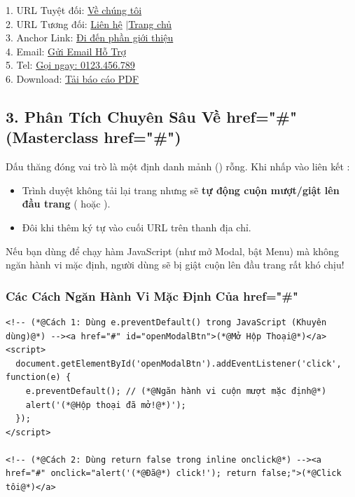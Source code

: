 \begin{browserWindow}
\sffamily\small
1. URL Tuyệt đối: \textcolor{primaryBlue}{\underline{Về chúng tôi}}\\[2pt]
2. URL Tương đối: \textcolor{primaryBlue}{\underline{Liên hệ}} \quad$\vert$\quad \textcolor{primaryBlue}{\underline{Trang chủ}}\\[2pt]
3. Anchor Link: \textcolor{primaryBlue}{\underline{Đi đến phần giới thiệu}}\\[2pt]
4. Email: \textcolor{primaryBlue}{\underline{Gửi Email Hỗ Trợ}}\\[2pt]
5. Tel: \textcolor{primaryBlue}{\underline{Gọi ngay: 0123.456.789}}\\[2pt]
6. Download: \textcolor{primaryBlue}{\underline{Tải báo cáo PDF}}
\end{browserWindow}

\subsection{3. Phân Tích Chuyên Sâu Về href="\#" (Masterclass href="\#")}
Dấu thăng  đóng vai trò là một định danh mảnh () rỗng. Khi nhấp vào liên kết :
\begin{itemize}
    \item Trình duyệt không tải lại trang nhưng sẽ \textbf{tự động cuộn mượt/giật lên đầu trang} ( hoặc ).
    \item Đôi khi thêm ký tự \codeinline{\#} vào cuối URL trên thanh địa chỉ.
\end{itemize}

\begin{warnBox}[Cạm Bẫy Giật Cuộn Trang Khi Dùng href="\#"]
Nếu bạn dùng  để chạy hàm JavaScript (như mở Modal, bật Menu) mà không ngăn hành vi mặc định, người dùng sẽ bị giật cuộn lên đầu trang rất khó chịu!
\end{warnBox}

\subsubsection{Các Cách Ngăn Hành Vi Mặc Định Của href="\#"}
\begin{codeWindow}[Mã Nguồn: Ngăn Hành Vi Cuộn Trang Khi Dùng href="\#"]
\begin{lstlisting}[language=HTML5]
<!-- (*@Cách 1: Dùng e.preventDefault() trong JavaScript (Khuyên dùng)@*) --><a href="#" id="openModalBtn">(*@Mở Hộp Thoại@*)</a><script>
  document.getElementById('openModalBtn').addEventListener('click', function(e) {
    e.preventDefault(); // (*@Ngăn hành vi cuộn mượt mặc định@*)
    alert('(*@Hộp thoại đã mở!@*)');
  });
</script>

<!-- (*@Cách 2: Dùng return false trong inline onclick@*) --><a href="#" onclick="alert('(*@Đã@*) click!'); return false;">(*@Click tôi@*)</a>
\end{lstlisting}
\end{codeWindow}

